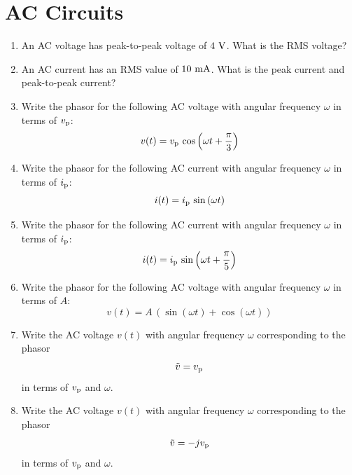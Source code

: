 \section{AC Circuits}
\begin{enumerate}
\item An AC voltage has peak-to-peak voltage of $4~\rm V$.  What is the RMS voltage?

\item An AC current has an RMS value of $10~\rm mA$.  What is the peak current and peak-to-peak current?
\item Write the phasor for the following AC voltage with angular frequency $\omega$ in terms of $v_{\rm p}$:
\begin{displaymath}
v(t) = v_{\rm p} \, \cos \left(\omega t + \frac{\pi}{3} \right)
\end{displaymath}

\item Write the phasor for the following AC current with angular frequency $\omega$ in terms of $i_{\rm p}$:
\begin{displaymath}
i(t) = i_{\rm p} \, \sin \left(\omega t \right)
\end{displaymath}

\item Write the phasor for the following AC current with angular frequency $\omega$ in terms of $i_{\rm p}$:
\begin{displaymath}
i(t) = i_{\rm p} \, \sin \left(\omega t + \frac{\pi}{5}\right)
\end{displaymath}
 
\item Write the phasor for the following AC voltage with angular frequency $\omega$ in terms of $A$:
\begin{displaymath}
v(t) = A \, (\sin(\omega t) + \cos (\omega t))
\end{displaymath}

\item Write the AC voltage $v(t)$ with angular frequency $\omega$ corresponding to the phasor
\begin{displaymath}
\tilde{v} = v_{\rm p}
\end{displaymath}
in terms of $v_{\rm p}$ and $\omega$.

 \item Write the AC voltage $v(t)$ with angular frequency $\omega$ corresponding to the phasor
\begin{displaymath}
\tilde{v} = - j v_{\rm p}
\end{displaymath}
in terms of $v_{\rm p}$ and $\omega$.


\end{enumerate}
